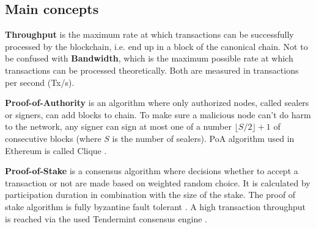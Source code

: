 \subsection{Main concepts}

\textbf{Throughput} is the maximum rate at which transactions can be successfully processed by the blockchain, i.e. end up in a block of the canonical chain. Not to be confused with \textbf{Bandwidth}, which is the maximum possible rate at which transactions can be processed theoretically. Both are measured in transactions per second (Tx/s).

\textbf{Proof-of-Authority} is an algorithm where only authorized nodes, called sealers or signers, can add blocks to chain. To make sure a malicious node can’t do harm to the network, any signer can sign at most one of a number $\lfloor S/2 \rfloor + 1$ of consecutive blocks (where $S$ is the number of sealers). PoA algorithm used in Ethereum is called Clique \cite{clique}.

\textbf{Proof-of-Stake} is a consensus algorithm where decisions whether to accept a transaction or not are made based on weighted random choice. It is calculated by participation
duration in combination with the size of the stake. The proof of stake algorithm is fully byzantine fault tolerant \cite{pos}. A high transaction throughput is
reached via the used Tendermint consensus engine \cite{burrow_git}.
